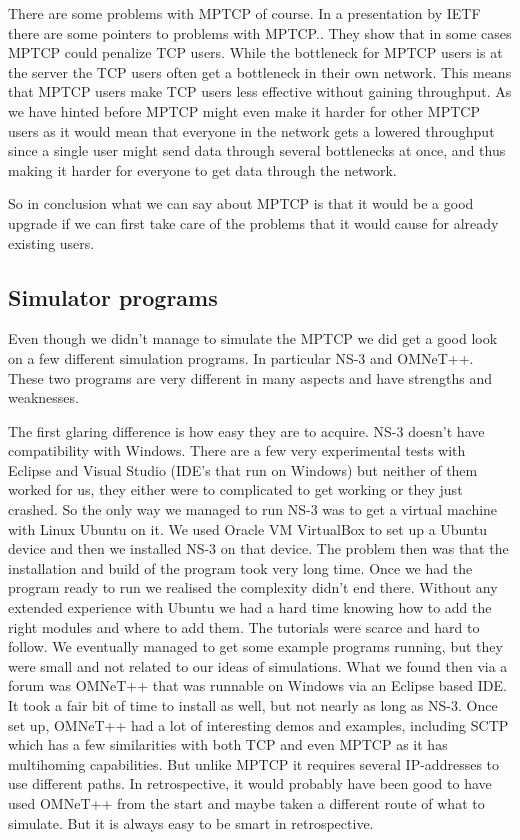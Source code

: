 \documentclass[11pt,twocolumn]{article}
\begin{document}
There are some problems with MPTCP of course. In a presentation by IETF there are some pointers to problems with MPTCP.\cite{IETF-Probs}. They show that in some cases MPTCP could penalize TCP users. While the bottleneck for MPTCP users is at the server the TCP users often get a bottleneck in their own network. This means that MPTCP users make TCP users less effective without gaining throughput. As we have hinted before MPTCP might even make it harder for other MPTCP users as it would mean that everyone in the network gets a lowered throughput since a single user might send data through several bottlenecks at once, and thus making it harder for everyone to get data through the network.

So in conclusion what we can say about MPTCP is that it would be a good upgrade if we can first take care of the problems that it would cause for already existing users.


\subsection{Simulator programs}

Even though we didn't manage to simulate the MPTCP we did get a good look on a few different simulation programs. In particular NS-3 and OMNeT++. These two programs are very different in many aspects and have strengths and weaknesses.

The first glaring difference is how easy they are to acquire. NS-3 doesn't have compatibility with Windows. There are a few very experimental tests with Eclipse and Visual Studio (IDE's that run on Windows) but neither of them worked for us, they either were to complicated to get working or they just crashed. So the only way we managed to run NS-3 was to get a virtual machine with Linux Ubuntu on it. We used Oracle VM VirtualBox to set up a Ubuntu device and then we installed NS-3 on that device. The problem then was that the installation and build of the program took very long time. Once we had the program ready to run we realised the complexity didn't end there. Without any extended experience with Ubuntu we had a hard time knowing how to add the right modules and where to add them. The tutorials were scarce and hard to follow. We eventually managed to get some example programs running, but they were small and not related to our ideas of simulations. What we found then via a forum was OMNeT++ that was runnable on Windows via an Eclipse based IDE. It took a fair bit of time to install as well, but not nearly as long as NS-3. Once set up, OMNeT++ had a lot of interesting demos and examples, including SCTP which has a few similarities with both TCP and even MPTCP as it has multihoming capabilities. But unlike MPTCP it requires several IP-addresses to use different paths. In retrospective, it would probably have been good to have used OMNeT++ from the start and maybe taken a different route of what to simulate. But it is always easy to be smart in retrospective.
\end{document}
